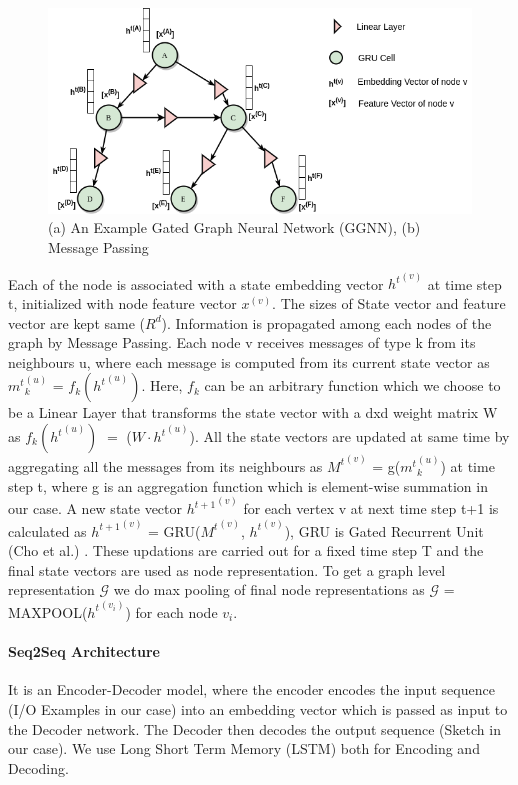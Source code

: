 \begin{figure}
    \centering
    \includegraphics[scale=0.5]{GGNN.png}
    \caption{(a) An Example Gated Graph Neural Network (GGNN), (b) Message Passing}
    \label{fig:ggnn}
\end{figure}

Each of the node is associated with a state embedding vector ${h^t}^{(v)}$ at time step t, initialized with node feature vector $x^{(v)}$. The sizes of State vector and feature vector are kept same ($R^d$). Information is propagated among each nodes of the graph by Message Passing. Each node v receives messages of type k from its neighbours u, where each message is computed from its current state vector as ${m^t}_{k}^{(u)}$ = $f_{k}({h^t}^{(u)})$. Here, $f_{k}$ can be an arbitrary function which we choose to be a Linear Layer that transforms the state vector with a dxd weight matrix W as $f_{k}({h^t}^{(u)})$ $=$ ($W \cdot {h^t}^{(u)}$). All the state vectors are updated at same time by aggregating all the messages from its neighbours as ${M^t}^{(v)}$ = g(${m^t}_{k}^{(u)}$) at time step t, where g is an aggregation function which is element-wise summation in our case. A new state vector ${h^{t+1}}^{(v)}$ for each vertex v at next time step t+1 is calculated as ${h^{t+1}}^{(v)}$ = GRU(${M^t}^{(v)}$, ${h^t}^{(v)}$), GRU is Gated Recurrent Unit (Cho et al.) \cite{chung2014empirical}. These updations are carried out for a fixed time step T and the final state vectors are used as node representation. To get a graph level representation $\mathcal{G}$ we do max pooling of final node representations as $\mathcal{G}$ = MAXPOOL(${h^t}^{(v_i)}$) for each node $v_i$.

\paragraph{Seq2Seq Architecture}
It is an Encoder-Decoder model, where the encoder encodes the input sequence (I/O Examples in our case) into an embedding vector which is passed as input to the Decoder network. The Decoder then decodes the output sequence (Sketch in our case). We use Long Short Term Memory (LSTM) both for Encoding and Decoding.

